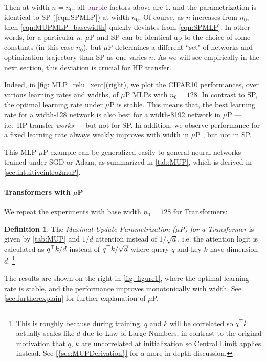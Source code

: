 \documentclass{article}
\theoremstyle{definition}
\newtheorem{defn}{Definition}[section]
\newcommand{\highlight}[1]{\textcolor{purple}{#1}}
\begin{document}
Then at width $n=n_0$, all \highlight{purple} factors above are 1, and the parametrization is identical to SP (\cref{eqn:SPMLP}) at width $n_0$.
Of course, as $n$ increases from $n_0$, then \cref{eqn:MUPMLP_basewidth} quickly deviates from \cref{eqn:SPMLP}.
In other words, for a particular $n$, $\mu$P and SP can be identical up to the choice of some constants (in this case $n_0$), but $\mu$P determines a different ``set" of networks and optimization trajectory than SP as one varies $n$.
As we will see empirically in the next section, this deviation is crucial for HP transfer.

Indeed, in \cref{fig: MLP_relu_xent}(right), we plot the CIFAR10 performances, over various learning rates and widths, of $\mu$P MLPs with $n_0 = 128$.
In contrast to SP,  the optimal learning rate under $\mu$P is stable.
This means that, the best learning rate for a width-128 network is also best for a width-8192 network in $\mu$P --- i.e.\ HP transfer \emph{works} --- but not for SP.
In addition, we observe performance for a fixed learning rate always weakly improves with width in $\mu$P , but not in SP.

This MLP $\mu$P example can be generalized easily to general neural networks trained under SGD or Adam, as summarized in \cref{tab:MUP}, 
which is derived in \cref{sec:intuitiveintro2muP}.

\paragraph{Transformers with $\mu$P}
We repeat the experiments with base width $n_0=128$ for Transformers:
\begin{defn}\label{defn:trsfmrMUP}
The \emph{Maximal Update Parametrization ($\mu$P) for a Transformer} is given by \cref{tab:MUP} and $1/d$ attention instead of $1/\sqrt{d}$, i.e. the attention logit is calculated as $q^\top k/d$ instead of $q^\top k / \sqrt d$ where query $q$ and key $k$ have dimension $d$.%
\footnote{This is roughly because during training, $q$ and $k$ will be correlated so $q^\top k$ actually scales like $d$ due to Law of Large Numbers, in contrast to the original motivation that $q$, $k$ are uncorrelated at initialization so Central Limit applies instead.
See \cref{{sec:MUPDerivation}} for a more in-depth discussion.}
\end{defn}
The results are shown on the right in \cref{fig: figure1}, where the optimal learning rate is stable, and the performance improves monotonically with width.
See \cref{sec:furtherexplain} for further explanation of $\mu$P.
\end{document}
